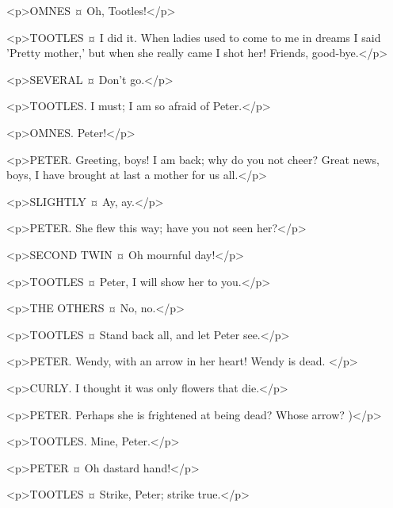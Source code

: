 <p>OMNES ¤
Oh, Tootles!</p>

<p>TOOTLES ¤
I did it. When ladies used to come to me in dreams I said 'Pretty mother,' but when she really came I shot her!
Friends, good-bye.</p>

<p>SEVERAL ¤
Don't go.</p>

<p>TOOTLES. I must; I am so afraid of Peter.</p>


<p>OMNES. Peter!</p>


<p>PETER. Greeting, boys!
I am back; why do you not cheer? Great news, boys, I have brought at last a mother for us all.</p>

<p>SLIGHTLY ¤
Ay, ay.</p>

<p>PETER. She flew this way; have you not seen her?</p>

<p>SECOND TWIN ¤
Oh mournful day!</p>

<p>TOOTLES ¤
Peter, I will show her to you.</p>

<p>THE OTHERS ¤
No, no.</p>

<p>TOOTLES ¤
Stand back all, and let Peter see.</p>


<p>PETER. Wendy, with an arrow in her heart!
Wendy is dead.
</p>

<p>CURLY. I thought it was only flowers that die.</p>

<p>PETER. Perhaps she is frightened at being dead?
Whose arrow?
)</p>

<p>TOOTLES. Mine, Peter.</p>

<p>PETER ¤
Oh dastard hand!</p>

<p>TOOTLES ¤
Strike, Peter; strike true.</p>

